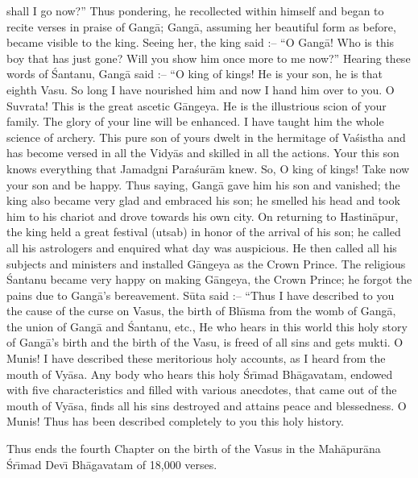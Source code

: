 shall I go now?'' Thus pondering, he recollected within himself and began to recite verses in praise of Gang\=a; Gang\=a, assuming her beautiful form as before, became visible to the king. Seeing her, the king said :-- ``O Gang\=a! Who is this boy that has just gone? Will you show him once more to me now?'' Hearing these words of \'Santanu, Gang\=a said :-- ``O king of kings! He is your son, he is that eighth Vasu. So long I have nourished him and now I hand him over to you. O Suvrata! This is the great ascetic G\=angeya. He is the illustrious scion of your family. The glory of your line will be enhanced. I have taught him the whole science of archery. This pure son of yours dwelt in the hermitage of Va\'sistha and has become versed in all the Vidy\=as and skilled in all the actions. Your this son knows everything that Jamadgni Para\'sur\=am knew. So, O king of kings! Take now your son and be happy. Thus saying, Gang\=a gave him his son and vanished; the king also became very glad and embraced his son; he smelled his head and took him to his chariot and drove towards his own city. On returning to Hastin\=apur, the king held a great festival (utsab) in honor of the arrival of his son; he called all his astrologers and enquired what day was auspicious. He then called all his subjects and ministers and installed G\=angeya as the Crown Prince. The religious \'Santanu became very happy on making G\=angeya, the Crown Prince; he forgot the pains due to Gang\=a's bereavement. S\=uta said :-- ``Thus I have described to you the cause of the curse on Vasus, the birth of Bh\={\i}sma from the womb of Gang\=a, the union of Gang\=a and \'Santanu, etc., He who hears in this world this holy story of Gang\=a's birth and the birth of the Vasu, is freed of all sins and gets mukti. O Munis! I have described these meritorious holy accounts, as I heard from the mouth of Vy\=asa. Any body who hears this holy \'Sr\={\i}mad Bh\=agavatam, endowed with five characteristics and filled with various anecdotes, that came out of the mouth of Vy\=asa, finds all his sins destroyed and attains peace and blessedness. O Munis! Thus has been described completely to you this holy history.

Thus ends the fourth Chapter on the birth of the Vasus in the Mah\=apur\=ana \'Sr\={\i}mad Dev\={\i} Bh\=agavatam of 18,000 verses.



